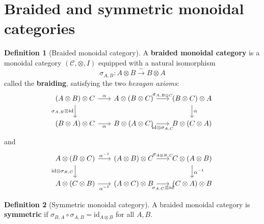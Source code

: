 \documentclass[a4paper,12pt]{book}
\newcommand{\id}{\mathrm{id}}
\theoremstyle{definition}
\newtheorem{definition}{Definition}[section]
\theoremstyle{plain}
\theoremstyle{remark}
\begin{document}


\section{Braided and symmetric monoidal categories}\label{sec:braided}


\begin{definition}[Braided monoidal category]\label{def:braided}
A \textbf{braided monoidal category} is a monoidal category
$(\mathcal{C}, \otimes, I)$ equipped with a natural isomorphism
\[
   \sigma_{A,B} \colon A\otimes B \xrightarrow{\;\sim\;} B\otimes A
\]
called the \textbf{braiding}, satisfying the two \emph{hexagon axioms}:
\[
\begin{tikzcd}[column sep=1.8em]
(A\otimes B)\otimes C
  \arrow[r, "\alpha"]
  \arrow[d, "\sigma_{A,B}\otimes\id"'] &
A\otimes(B\otimes C)
  \arrow[r, "\sigma_{A,B\otimes C}"] &
(B\otimes C)\otimes A
  \arrow[d, "\alpha"] \\
(B\otimes A)\otimes C
  \arrow[r, "\alpha"'] &
B\otimes(A\otimes C)
  \arrow[r, "\id\otimes\sigma_{A,C}"'] &
B\otimes(C\otimes A)
\end{tikzcd}
\]
and
\[
\begin{tikzcd}[column sep=1.8em]
A\otimes(B\otimes C)
  \arrow[r, "\alpha^{-1}"]
  \arrow[d, "\id\otimes\sigma_{B,C}"'] &
(A\otimes B)\otimes C
  \arrow[r, "\sigma_{A\otimes B,C}"] &
C\otimes(A\otimes B)
  \arrow[d, "\alpha^{-1}"] \\
A\otimes(C\otimes B)
  \arrow[r, "\alpha^{-1}"'] &
(A\otimes C)\otimes B
  \arrow[r, "\sigma_{A,C}\otimes\id"'] &
(C\otimes A)\otimes B
\end{tikzcd}
\]
\end{definition}

\begin{definition}[Symmetric monoidal category]\label{def:symmetric}
A braided monoidal category is \textbf{symmetric} if
$\sigma_{B,A}\circ \sigma_{A,B} = \id_{A\otimes B}$ for all $A,B$.
\end{definition}
\end{document}
